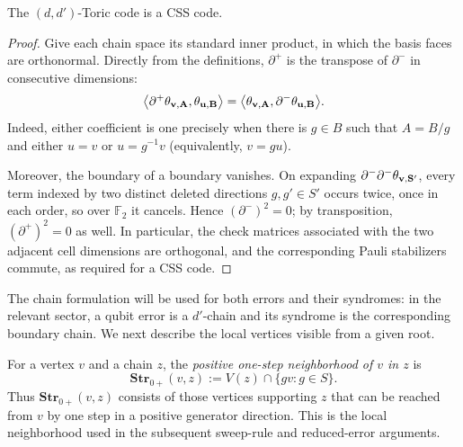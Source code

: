 \begin{claim}
\label{claim:csscode}
The $(d,d')$-Toric code is a CSS code.
\end{claim}
\begin{proof}
Give each chain space its standard inner product, in which the basis faces are orthonormal. Directly from the definitions, $\partial^+$ is the transpose of $\partial^-$ in consecutive dimensions:
\begin{equation*}
  \bigl\langle\partial^+\mathbf{\theta_{v ,A} },\mathbf{\theta_{u ,B} }\bigr\rangle
  =\bigl\langle\mathbf{\theta_{v ,A} },\partial^-\mathbf{\theta_{u ,B} }\bigr\rangle.
\end{equation*}
Indeed, either coefficient is one precisely when there is $g\in B$ such that $A=B/g$ and either $u=v$ or $u=g^{-1}v$ (equivalently, $v=gu$).

Moreover, the boundary of a boundary vanishes. On expanding $\partial^-\partial^-\mathbf{\theta_{v ,S'} }$, every term indexed by two distinct deleted directions $g,g'\in S'$ occurs twice, once in each order, so over $\mathbb F_2$ it cancels. Hence $(\partial^-)^2=0$; by transposition, $(\partial^+)^2=0$ as well. In particular, the check matrices associated with the two adjacent cell dimensions are orthogonal, and the corresponding Pauli stabilizers commute, as required for a CSS code.
\end{proof}

The chain formulation will be used for both errors and their syndromes: in the relevant sector, a qubit error is a $d'$-chain and its syndrome is the corresponding boundary chain. We next describe the local vertices visible from a given root.

\begin{definition}
\label{def:positiveNei}
For a vertex $v$ and a chain $z$, the \emph{positive one-step neighborhood of $v$ in $z$} is
\begin{equation*}
  \textbf{Str}_{0+}(v,z)
  :=V(z)\cap\{gv:g\in S\}.
\end{equation*}
Thus $\textbf{Str}_{0+}(v,z)$ consists of those vertices supporting $z$ that can be reached from $v$ by one step in a positive generator direction. This is the local neighborhood used in the subsequent sweep-rule and reduced-error arguments.
\end{definition}
